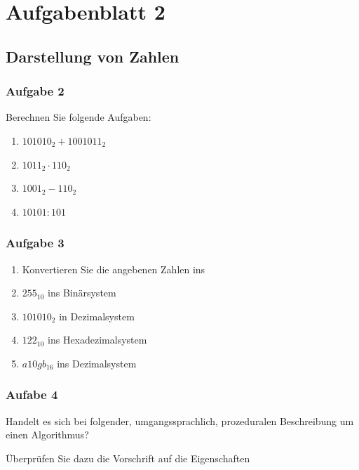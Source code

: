 \documentclass[
  11pt,
  a4paper,
  DIV=11,
  numbers=noendperiod]{scrartcl}
\author{}
\date{}
\begin{document}
\section{Aufgabenblatt 2}\label{aufgabenblatt-2}

\subsection{Darstellung von Zahlen}\label{darstellung-von-zahlen}

\subsubsection{Aufgabe 2}\label{aufgabe-2}

Berechnen Sie folgende Aufgaben:

\begin{enumerate}
\def\labelenumi{\alph{enumi})}
\item
  \(101010_2 + 1001011_2\)
\item
  \(1011_2 \cdot 110_2\)
\item
  \(1001_2 - 110_2\)
\item
  \(10101 : 101\)
\end{enumerate}

\subsubsection{Aufgabe 3}\label{aufgabe-3}

\begin{enumerate}
\def\labelenumi{\alph{enumi})}
\item
  Konvertieren Sie die angebenen Zahlen ins
\item
  \(255_{10}\) ins Binärsystem
\item
  \(101010_2\) in Dezimalsystem
\item
  \(122_{10}\) ins Hexadezimalsystem
\item
  \(a10gb_{16}\) ins Dezimalsystem
\end{enumerate}

\subsubsection{Aufabe 4}\label{aufabe-4}

Handelt es sich bei folgender, umgangssprachlich, prozeduralen
Beschreibung um einen Algorithmus?

Überprüfen Sie dazu die Vorschrift auf die Eigenschaften
\end{document}
